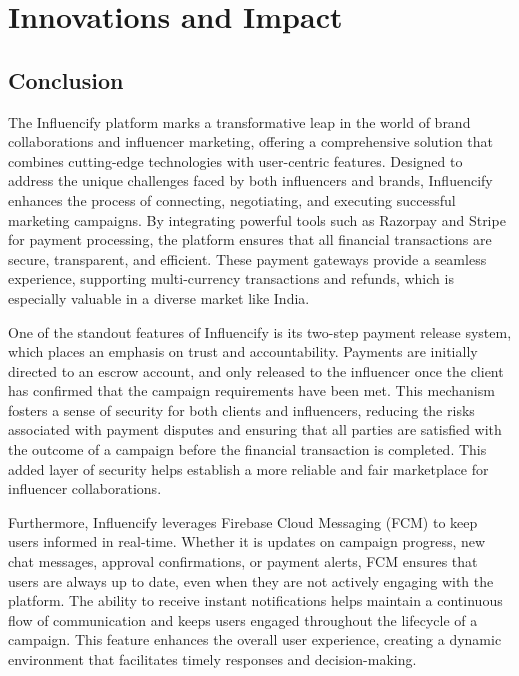 \chapter{Innovations and Impact}
\begin{justify}
    \section{Conclusion}
    
The Influencify platform marks a transformative leap in the world of brand collaborations and influencer marketing, offering a comprehensive solution that combines cutting-edge technologies with user-centric features. Designed to address the unique challenges faced by both influencers and brands, Influencify enhances the process of connecting, negotiating, and executing successful marketing campaigns. By integrating powerful tools such as Razorpay and Stripe for payment processing, the platform ensures that all financial transactions are secure, transparent, and efficient. These payment gateways provide a seamless experience, supporting multi-currency transactions and refunds, which is especially valuable in a diverse market like India.

One of the standout features of Influencify is its two-step payment release system, which places an emphasis on trust and accountability. Payments are initially directed to an escrow account, and only released to the influencer once the client has confirmed that the campaign requirements have been met. This mechanism fosters a sense of security for both clients and influencers, reducing the risks associated with payment disputes and ensuring that all parties are satisfied with the outcome of a campaign before the financial transaction is completed. This added layer of security helps establish a more reliable and fair marketplace for influencer collaborations.

Furthermore, Influencify leverages Firebase Cloud Messaging (FCM) to keep users informed in real-time. Whether it is updates on campaign progress, new chat messages, approval confirmations, or payment alerts, FCM ensures that users are always up to date, even when they are not actively engaging with the platform. The ability to receive instant notifications helps maintain a continuous flow of communication and keeps users engaged throughout the lifecycle of a campaign. This feature enhances the overall user experience, creating a dynamic environment that facilitates timely responses and decision-making.


\end{justify}
